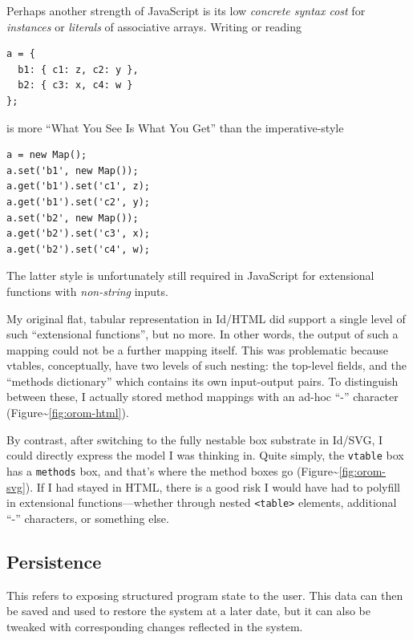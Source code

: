 Perhaps another strength of JavaScript is its low \emph{concrete syntax
cost} for \emph{instances} or \emph{literals} of associative arrays.
Writing or reading

\begin{lstlisting}
a = {
  b1: { c1: z, c2: y },
  b2: { c3: x, c4: w }
};
\end{lstlisting}

is more ``What You See Is What You Get'' than the imperative-style

\begin{lstlisting}
a = new Map();
a.set('b1', new Map());
a.get('b1').set('c1', z);
a.get('b1').set('c2', y);
a.set('b2', new Map());
a.get('b2').set('c3', x);
a.get('b2').set('c4', w);
\end{lstlisting}

The latter style is unfortunately still required in JavaScript for
extensional functions with \emph{non-string} inputs.

My original flat, tabular representation in Id{}/HTML did support a
single level of such ``extensional functions'', but no more. In other
words, the output of such a mapping could not be a further mapping
itself. This was problematic because vtables, conceptually, have two
levels of such nesting: the top-level fields, and the ``methods
dictionary'' which contains its own input-output pairs. To distinguish
between these, I actually stored method mappings with an ad-hoc ``-''
character (Figure\textasciitilde{}\ref{fig:orom-html}).

By contrast, after switching to the fully nestable box substrate in
Id{}/SVG, I could directly express the model I was thinking in. Quite
simply, the \texttt{vtable} box has a \texttt{methods} box, and that's
where the method boxes go (Figure\textasciitilde{}\ref{fig:orom-svg}).
If I had stayed in HTML, there is a good risk I would have had to
polyfill in extensional functions---whether through nested
\texttt{\textless{}table\textgreater{}} elements, additional ``-''
characters, or something else.

\hypertarget{persistence}{%
\subsection{Persistence}\label{persistence}}

This refers to exposing structured program state to the user. This data
can then be saved and used to restore the system at a later date, but it
can also be tweaked with corresponding changes reflected in the system.


